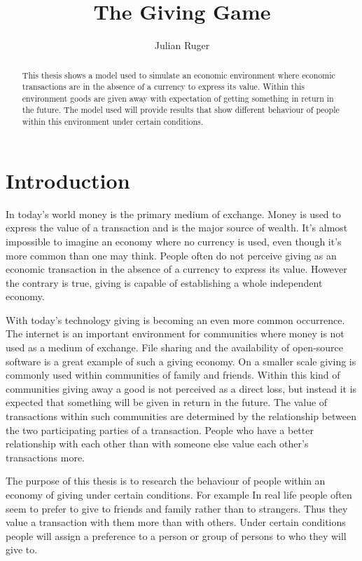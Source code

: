 \documentclass[twoside,openright]{uva-bachelor-thesis}
\title{The Giving Game}
\author{Julian Ruger}
\begin{document}
\maketitle

\begin{abstract}
This thesis shows a model used to simulate an economic environment where economic transactions are in the absence of a currency to express its value. Within this environment goods are given away with expectation of getting something in return in the future. The model used will provide results that show different behaviour of people within this environment under certain conditions.
\end{abstract}

\tableofcontents

\chapter{Introduction}
In today's world money is the primary medium of exchange. Money is used to express the value of a transaction and is the major source of wealth. It's almost impossible to imagine an economy where no currency is used, even though it's more common than one may think. People often do not perceive giving as an economic transaction in the absence of a currency to express its value. However the contrary is true, giving is capable of establishing a whole independent economy. 

With today's technology giving is becoming an even more common occurrence. The internet is an important environment for communities where money is not used as a medium of exchange. File sharing and the availability of open-source software is a great example of such a giving economy. On a smaller scale giving is commonly used within communities of family and friends. Within this kind of communities giving away a good is not perceived as a direct loss, but instead it is expected that something will be given in return in the future. The value of transactions within such communities are determined by the relationship between the two participating parties of a transaction. People who have a better relationship with each other than with someone else value each other’s transactions more. 

The purpose of this thesis is to research the behaviour of people within an economy of giving under certain conditions. For example In real life people often seem to prefer to give to friends and family rather than to strangers. Thus they value a transaction with them more than with others. Under certain conditions people will assign a preference to a person or group of persons to who they will give to. 
\end{document}
